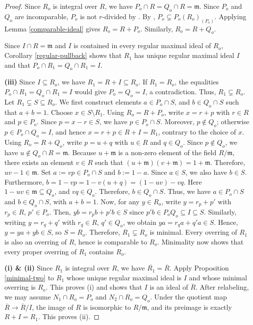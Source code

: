 \documentclass[12pt]{article}
\begin{document}
	\begin{proof}
		Since $R_o$ is integral over $R$, we have $P_o\cap R=Q_o\cap R=\mathfrak{m}$. Since $P_o$ and $Q_o$ are incomparable, $P_o$ is not $r$-divided by \cite[Theorem 2.8]{marot}. By \cite[Theorem 2.10]{marot}, $P_o\subsetneq P_o(R_o)_{(P_o)}$. Applying Lemma \ref{comparable-ideal} gives $R_o=R+P_o$. Similarly, $R_o=R+Q_o$.
		
		Since $I\cap R=\mathfrak{m}$ and $I$ is contained in every regular maximal ideal of $R_o$, Corollary \ref{regular-pullback} shows that $R_1$ has unique regular maximal ideal $I$ and that $P_o\cap R_1=Q_o\cap R_1=I$.
		
		\textbf{(iii)} Since $I\subseteq R_o$, we have $R_1=R+I\subseteq R_o$. If $R_1=R_o$, the equalities $P_o\cap R_1=Q_o\cap R_1=I$ would give $P_o=Q_o=I$, a contradiction. Thus, $R_1\subsetneq R_o$. Let $R_1\subsetneq S\subseteq R_o$. We first construct elements $a\in P_o\cap S$, and $b\in Q_o\cap S$ such that $a+b=1$. Choose $x\in S\setminus R_1$. Using $R_o=R+P_o$, write $x=r+p$ with $r\in R$ and $p\in P_o$. Since $p=x-r\in S$, we have $p\in P_o\cap S$. Moreover, $p\notin Q_o$; otherwise $p\in P_o\cap Q_o=I$, and hence $x=r+p\in R+I=R_1$, contrary to the choice of $x$. Using $R_o=R+Q_o$, write $p=u+q$ with $u\in R$ and $q\in Q_o$. Since $p\notin Q_o$, we have $u\notin Q_o\cap R=\mathfrak{m}$. Because $u+\mathfrak{m}$ is a non-zero element of the field $R/\mathfrak{m}$, there exists an element $v\in R$ such that $(u+\mathfrak{m})(v+\mathfrak{m})=1+\mathfrak{m}$. Therefore, $uv-1\in \mathfrak{m}$. Set $a:=vp\in P_o\cap S$ and $b:=1-a$. Since $a\in S$, we also have $b\in S$. Furthermore, $b=1-vp=1-v(u+q)=(1-uv)-vq$. Here $1-uv\in \mathfrak{m}\subseteq Q_o$, and $vq\in Q_o$. Therefore, $b\in Q_o\cap S$. Thus, we have $a\in P_o\cap S$ and $b\in Q_o\cap S$, with $a+b=1$. Now, for any $y\in R_o$, write $y=r_p+p'$ with $r_p\in R$, $p'\in P_o$. Then, $yb=r_pb+p'b\in S$ since $p'b\in P_oQ_o\subseteq I\subseteq S$. Similarly, writing $y=r_q+q'$ with $r_q\in R$, $q'\in Q_o$, we obtain $ya=r_qa+q'a\in S$. Hence, $y=ya+yb\in S$, so $S=R_o$. Therefore, $R_1\subsetneq R_o$ is minimal. Every overring of $R_1$ is also an overring of $R$, hence is comparable to $R_o$. Minimality now shows that every proper overring of $R_1$ contains $R_o$.
		
		\textbf{(i) \& (ii)} Since $R_1$ is integral over $R$, we have $\overline{R_1}=\overline R$. Apply Proposition \ref{minimal-two} to $R_1$ whose unique regular maximal ideal is $I$ and whose minimal overring is $R_o$. This proves (i) and shows that $I$ is an ideal of $\overline R$. After relabeling, we may assume $N_1\cap R_o=P_o$ and $N_2\cap R_o=Q_o$. Under the quotient map $\overline R\to\overline R/I$, the image of $R$ is isomorphic to $R/\mathfrak{m}$, and its preimage is exactly $R+I=R_1$. This proves (ii).
		

\end{proof}
\end{document}
